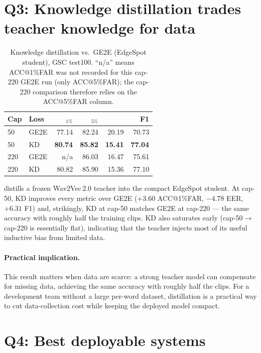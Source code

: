 \documentclass[12pt,a4paper]{report}
\newcommand{\acc}{\text{ACC}}
\newcommand{\eer}{\text{EER}}
\newcommand{\best}[1]{\textbf{#1}}
\begin{document}
\section{Q3: Knowledge distillation trades teacher knowledge for data}\label{sec:res-q3}

\begin{table}[H]
\centering
\caption{Knowledge distillation vs.\ GE2E (EdgeSpot student), GSC test100.
``n/a'' means ACC@1\%FAR was not recorded for this cap-220 GE2E run (only
ACC@5\%FAR); the cap-220 comparison therefore relies on the ACC@5\%FAR column.}
\label{tab:kd}
\small
\begin{tabular}{l l r r r r}
\toprule
\textbf{Cap} & \textbf{Loss} & \acc$_{1\%}$ & \acc$_{5\%}$ & \eer & F1\\
\midrule
50  & GE2E & 77.14 & 82.24 & 20.19 & 70.73 \\
\rowcolor{blue!7}
50  & KD   & \best{80.74} & \best{85.82} & \best{15.41} & \best{77.04} \\
220 & GE2E & n/a   & 86.03 & 16.47 & 75.61 \\
220 & KD   & 80.82 & 85.90 & 15.36 & 77.10 \\
\bottomrule
\end{tabular}
\end{table}

 distills a frozen Wav2Vec\,2.0 teacher into the compact EdgeSpot
student. At cap-50, KD improves every metric over GE2E ($+3.60$ ACC@1\%FAR,
$-4.78$ EER, $+6.31$ F1) and, strikingly, KD at cap-50 matches GE2E at cap-220 ---
the same accuracy with roughly half the training clips. KD also saturates early
(cap-50$\to$cap-220 is essentially flat), indicating that the teacher injects most
of its useful inductive bias from limited data.

\paragraph{Practical implication.} This result matters when data are scarce: a
strong teacher model can compensate for missing data, achieving the same accuracy
with roughly half the clips. For a development team without a large per-word
dataset, distillation is a practical way to cut data-collection cost while keeping
the deployed model compact.

\section{Q4: Best deployable systems}\label{sec:res-q4}
\end{document}
